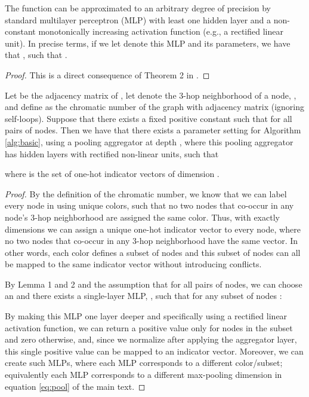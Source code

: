 \begin{lemma}
The function  can be approximated to an arbitrary degree of precision by standard multilayer perceptron (MLP) with least one hidden layer and a non-constant monotonically increasing activation function (e.g., a rectified linear unit).  In precise terms, if we let  denote this MLP and  its parameters, we have that ,  such that 
.
\end{lemma}
\begin{proof}
This is a direct consequence of Theorem 2 in \cite{hornik1991approximation}.
\end{proof}

\begin{lemma}
Let  be the adjacency matrix of , let  denote the 3-hop neighborhood of a node, , and define  as the chromatic number of the graph with adjacency matrix  (ignoring self-loops). Suppose that there exists a fixed positive constant  such that  for all pairs of nodes. Then we have that there exists a parameter setting for Algorithm \ref{alg:basic}, using a pooling aggregator at depth , where this pooling aggregator has  hidden layers with rectified non-linear units, such that 

where  is the set of one-hot indicator vectors of dimension .
\end{lemma}
\begin{proof}
By the definition of the chromatic number, we know that we can label every node in  using  unique colors, such that no two nodes that co-occur in any node's 3-hop neighborhood are assigned the same color. 
Thus, with exactly  dimensions we can assign a unique one-hot indicator vector to every node, where no two nodes that co-occur in any 3-hop neighborhood have the same vector. 
In other words, each color defines a subset of nodes  and this subset of nodes can all be mapped to the same indicator vector without introducing conflicts. 

By Lemma 1 and 2 and the assumption that  for all pairs of nodes, we can choose an  and there exists a single-layer MLP, , such that for any subset of nodes :

By making this MLP one layer deeper and specifically using a rectified linear activation function, we can return a positive value only for nodes in the subset  and zero otherwise, and, since we normalize after applying the aggregator layer, this single positive value can be mapped to an indicator vector. 
Moreover, we can create  such MLPs, where each MLP corresponds to a different color/subset; equivalently each MLP corresponds to a different max-pooling dimension in equation \ref{eq:pool} of the main text. 
\end{proof}



